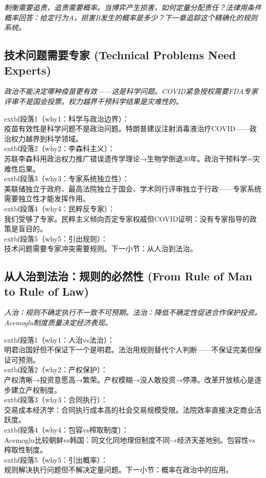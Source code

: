 \documentclass[a4paper,12pt]{book}
\newenvironment{motivation}{\begin{tcolorbox}[colback=gray!10,colframe=gray!60,title=\textit{本章动机 (Motivation)},fonttitle=\bfseries,arc=0mm,leftrule=3mm]\small\itshape}{\end{tcolorbox}}
\begin{document}
\begin{motivation}
\begin{motivation}
\begin{motivation}
制衡需要追责，追责需要概率。当博弈产生损害，如何定量分配责任？法律用条件概率回答：给定行为A，损害B发生的概率是多少？下一章追踪这个精确化的规则系统。

	
	\subsection{技术问题需要专家 (Technical Problems Need Experts)}
	\begin{motivation}政治不能决定哪种疫苗更有效——这是科学问题。COVID紧急授权需要FDA专家评审不是国会投票。权力越界干预科学结果是灾难性的。\end{motivation}
		extbf{段落1（why1：科学与政治边界）}：\\疫苗有效性是科学问题不是政治问题。特朗普建议注射消毒液治疗COVID——政治权力越界到科学领域。\\	extbf{段落2（why2：李森科主义）}：\\苏联李森科用政治权力推广错误遗传学理论→生物学倒退30年。政治干预科学=灾难性后果。\\	extbf{段落3（why3：专家系统独立性）}：\\美联储独立于政府、最高法院独立于国会、学术同行评审独立于行政——专家系统需要独立性才能发挥作用。\\	extbf{段落4（why4：民粹反专家）}：\\我们受够了专家。民粹主义倾向否定专家权威但COVID证明：没有专家指导的政策是盲目的。\\	extbf{段落5（why5：引出规则）}：\\技术问题需要专家冲突需要规则。下一小节：从人治到法治。

	\subsection{从人治到法治：规则的必然性 (From Rule of Man to Rule of Law)}
	\begin{motivation}人治：规则不确定执行不一致不可预期。法治：降低不确定性促进合作保护投资。Acemoglu制度质量决定经济表现。\end{motivation}
		extbf{段落1（why1：人治vs法治）}：\\明君治国好但不保证下一个是明君。法治用规则替代个人判断——不保证完美但保证可预测。\\	extbf{段落2（why2：产权保护）}：\\产权清晰→投资意愿高→繁荣。产权模糊→没人敢投资→停滞。改革开放核心是逐步建立产权制度。\\	extbf{段落3（why3：合同执行）}：\\交易成本经济学：合同执行成本高的社会交易规模受限。法院效率直接决定商业活跃度。\\	extbf{段落4（why4：包容vs榨取制度）}：\\Acemoglu比较朝鲜vs韩国：同文化同地理但制度不同→经济天差地别。包容性vs榨取性制度。\\	extbf{段落5（why5：引出概率）}：\\规则解决执行问题但不解决定量问题。下一小节：概率在政治中的应用。


\end{motivation}
\end{motivation}
\end{motivation}
\end{document}
